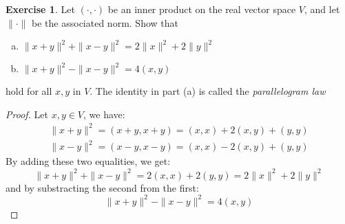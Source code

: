 \documentclass[11pt,a4paper,twoside]{article}
\theoremstyle{definition}
\newcounter{excounter}
\newtheorem{exercise}[excounter]{Exercise}
\begin{document}
\begin{exercise}

  Let $(\cdot, \cdot)$ be an inner product on the real vector space $V$, and let $\| \cdot \|$ be the associated norm.
  Show that
  \begin{enumerate}[(a)]
  \item $\| x + y \|^2 + \| x - y \|^2 = 2 \| x \|^2 + 2 \| y \|^2$
  \item $\| x + y \|^2 - \| x - y \|^2 = 4 (x, y)$
  \end{enumerate}
  hold for all $x, y$ in $V$. The identity in part (a) is called the \emph{parallelogram law}

\end{exercise}

\begin{proof}\hfill

  Let $x, y \in V$, we have:
  \begin{align*}
    \| x + y \|^2 = (x + y, x + y) = (x, x) + 2 (x, y) + (y, y) \\
    \| x - y \|^2 = (x - y, x - y) = (x, x) - 2 (x, y) + (y, y)
  \end{align*}
  By adding these two equalities, we get:
  \begin{equation*}
    \| x + y \|^2 + \| x - y \|^2 = 2 (x, x) + 2 (y, y) = 2 \| x \|^2 + 2 \| y \|^2
  \end{equation*}
  and by substracting the second from the first:
  \begin{equation*}
    \| x + y \|^2 - \| x - y \|^2 = 4 (x, y)
  \end{equation*}

\end{proof}
\end{document}
